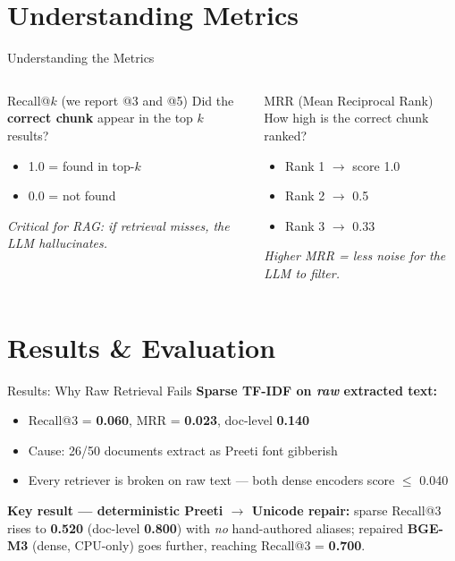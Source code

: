 \documentclass[11pt,aspectratio=169]{beamer}
\begin{document}
\section{Understanding Metrics}
\begin{frame}{Understanding the Metrics}
  \begin{columns}[T]
    \begin{block}{Recall@$k$ (we report @3 and @5)}
      Did the \textbf{correct chunk} appear in the top $k$ results?
      \begin{itemize}
        \item 1.0 = found in top-$k$
        \item 0.0 = not found
      \end{itemize}
      \small\textit{Critical for RAG: if retrieval misses, the LLM hallucinates.}
    \end{block}
    \begin{block}{MRR (Mean Reciprocal Rank)}
      How high is the correct chunk ranked?
      \begin{itemize}
        \item Rank 1 $\rightarrow$ score 1.0
        \item Rank 2 $\rightarrow$ 0.5
        \item Rank 3 $\rightarrow$ 0.33
      \end{itemize}
      \small\textit{Higher MRR = less noise for the LLM to filter.}
    \end{block}
  \end{columns}
\end{frame}

\section{Results \& Evaluation}
\begin{frame}{Results: Why Raw Retrieval Fails}
  \textbf{Sparse TF-IDF on \emph{raw} extracted text:}
  \begin{itemize}
    \item Recall@3 = \textbf{0.060}, MRR = \textbf{0.023}, doc-level \textbf{0.140}
    \item Cause: 26/50 documents extract as Preeti font gibberish
    \item Every retriever is broken on raw text --- both dense encoders score $\le$ 0.040
  \end{itemize}
  \vspace{0.2cm}
  \textbf{Key result — deterministic Preeti $\rightarrow$ Unicode repair:} sparse Recall@3 rises to \textbf{0.520} (doc-level \textbf{0.800}) with \emph{no} hand-authored aliases; repaired \textbf{BGE-M3} (dense, CPU-only) goes further, reaching Recall@3 = \textbf{0.700}.
\end{frame}
\end{document}
